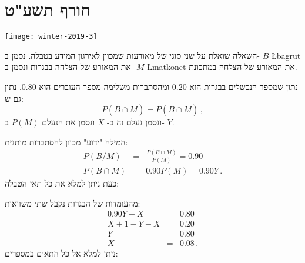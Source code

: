 
\newpage

\section{חורף תשע"ט}

\begin{center}
\texttt{[image: winter-2019-3]}
\end{center}

השאלה שואלת על שני סוגי של מאורעות שמכוון לאירגון המידע בטבלה. נסמן ב-%
$B$ \L{bagrut}
את המאורע של הצלחה בבגרות ונסמן ב-%
$M$ \L{matkonet}
את המאורע של הצלחה במתכונת.

נתון שמספר הנכשלים בבגרות הוא 
$0.20$
ומהסתברות משלימה מספר העוברים הוא
$0.80$.
נתון גם ש:
\[
P(B\cap\overline{M})=P(\overline{B}\cap M)\,,
\]
ונסמן נעלם זה ב-%
$X$
ונסמן את הנעלם
$P(M)$
ב-%
$Y$.

המילה "ידוע" מכוון להסתברות מותנית:
\begin{eqnarray*}
P(B/M)&=&\frac{P(B\cap M)}{P(M)}=0.90\\
P(B\cap M)&=&0.90 P(M)=0.90Y\,.
\end{eqnarray*}
כעת ניתן למלא את כל תאי הטבלה:
\begin{center}
\end{center}

מהעומדות של הבגרות נקבל שתי משוואות:
\begin{eqnarray*}
0.90Y+X&=&0.80\\
X+1-Y-X&=&0.20\\
Y&=&0.80\\
X&=&0.08\,.
\end{eqnarray*}
ניתן למלא אל כל התאים במספרים:
\begin{center}
\end{center}

